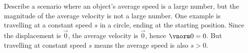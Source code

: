{Describe a scenario where an object's average speed is a large number, but the magnitude of the average velocity is not a large number.
}
{
One example is travelling at a constant speed $s$ in a circle, ending at the starting position. Since the displacement is $\vec 0$, the average velocity is $\vec 0$, hence $\vnorm 0=0$. But travelling at constant speed $s$ means the average speed is also $s >0$.
}

